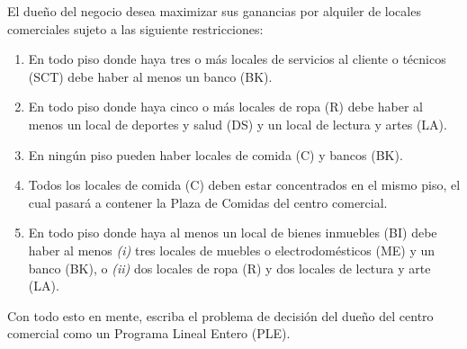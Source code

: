 \documentclass[ a4paper, twoside, 11pt]{article}
\begin{document}
\begin{problem}
\begin{itemize}
\end{itemize}

El due\~no del negocio desea maximizar sus ganancias por alquiler de locales comerciales sujeto a las siguiente restricciones: 
\begin{enumerate}[label=\textbf{\alph*)}]
\item En todo piso donde haya tres o m\'as locales de servicios al cliente o t\'ecnicos (SCT) debe haber al menos un banco (BK). 
\item En todo piso donde haya cinco o m\'as locales de ropa (R) debe haber al menos un local de deportes y salud (DS) y un local de lectura y artes (LA). 
\item En ning\'un piso pueden haber locales de comida (C) y bancos (BK). 
\item Todos los locales de comida (C) deben estar concentrados en el mismo piso, el cual pasar\'a a contener la Plaza de Comidas del centro comercial. 
\item En todo piso donde haya al menos un local de bienes inmuebles (BI) debe haber al menos \textit{(i)} tres locales de muebles o electrodom\'esticos (ME) y un banco (BK), o \textit{(ii)} dos locales de ropa (R) y dos locales de lectura y arte (LA). 
\end{enumerate}

Con todo esto en mente, escriba el problema de decisi\'on del due\~no del centro comercial como un Programa Lineal Entero (PLE). \QED


\end{problem}
\end{document}
